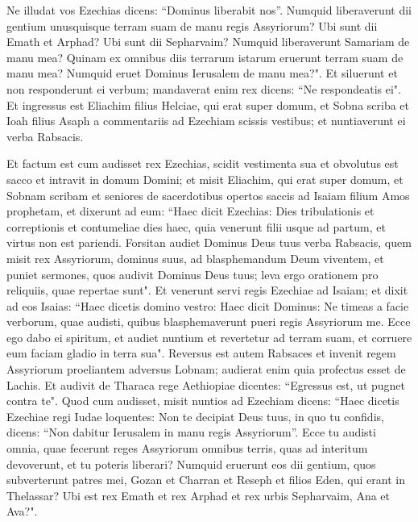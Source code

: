 \begin{biblechapter}
\verse Ne illudat vos Ezechias dicens: “Dominus liberabit nos”. Numquid liberaverunt dii gentium unusquisque terram suam de manu regis Assyriorum? 
\verse Ubi sunt dii Emath et Arphad? Ubi sunt dii Sepharvaim? Numquid liberaverunt Samariam de manu mea?  
\verse Quinam ex omnibus diis terrarum istarum eruerunt terram suam de manu mea? Numquid eruet Dominus Ierusalem de manu mea?". 
\verse Et siluerunt et non responderunt ei verbum; mandaverat enim rex dicens: “Ne respondeatis ei". 
\verse Et ingressus est Eliachim filius Helciae, qui erat super domum, et Sobna scriba et Ioah filius Asaph a commentariis ad Ezechiam scissis vestibus; et nuntiaverunt ei verba Rabsacis. 
\end{biblechapter}

\begin{biblechapter}  
\verse Et factum est cum audisset rex Ezechias, scidit vestimenta sua et obvolutus est sacco et intravit in domum Domini; 
\verse et misit Eliachim, qui erat super domum, et Sobnam scribam et seniores de sacerdotibus opertos saccis ad Isaiam filium Amos prophetam, 
\verse et dixerunt ad eum: “Haec dicit Ezechias: Dies tribulationis et correptionis et contumeliae dies haec, quia venerunt filii usque ad partum, et virtus non est pariendi. 
\verse Forsitan audiet Dominus Deus tuus verba Rabsacis, quem misit rex Assyriorum, dominus suus, ad blasphemandum Deum viventem, et puniet sermones, quos audivit Dominus Deus tuus; leva ergo orationem pro reliquiis, quae repertae sunt". 
\verse Et venerunt servi regis Ezechiae ad Isaiam; 
\verse et dixit ad eos Isaias: “Haec dicetis domino vestro: Haec dicit Dominus: Ne timeas a facie verborum, quae audisti, quibus blasphemaverunt pueri regis Assyriorum me. 
\verse Ecce ego dabo ei spiritum, et audiet nuntium et revertetur ad terram suam, et corruere eum faciam gladio in terra sua". 
\verse Reversus est autem Rabsaces et invenit regem Assyriorum proeliantem adversus Lobnam; audierat enim quia profectus esset de Lachis. 
\verse Et audivit de Tharaca rege Aethiopiae dicentes: “Egressus est, ut pugnet contra te". Quod cum audisset, misit nuntios ad Ezechiam dicens: 
\verse “Haec dicetis Ezechiae regi Iudae loquentes: Non te decipiat Deus tuus, in quo tu confidis, dicens: “Non dabitur Ierusalem in manu regis Assyriorum”. 
\verse Ecce tu audisti omnia, quae fecerunt reges Assyriorum omnibus terris, quas ad interitum devoverunt, et tu poteris liberari? 
\verse Numquid eruerunt eos dii gentium, quos subverterunt patres mei, Gozan et Charran et Reseph et filios Eden, qui erant in Thelassar? 
\verse Ubi est rex Emath et rex Arphad et rex urbis Sepharvaim, Ana et Ava?". 

\end{biblechapter}

